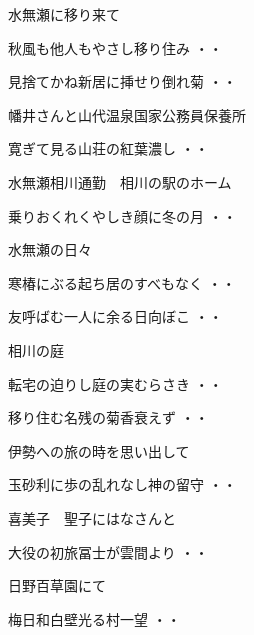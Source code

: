 水無瀬に移り来て
\begin{shiika}秋風も他人もやさし移り住み
\hfill{・・}\end{shiika}
\begin{shiika}見捨てかね新居に挿せり倒れ菊
\hfill{・・}\end{shiika}
\vspace{0.6cm}
幡井さんと山代温泉国家公務員保養所
\begin{shiika}寛ぎて見る山荘の紅葉濃し
\hfill{・・}\end{shiika}
\vspace{0.6cm}
水無瀬相川通勤　相川の駅のホーム
\begin{shiika}乗りおくれくやしき顔に冬の月
\hfill{・・}\end{shiika}
\vspace{0.6cm}
水無瀬の日々
\begin{shiika}寒椿にぶる起ち居のすべもなく
\hfill{・・}\end{shiika}
\vspace{0.6cm}
\begin{shiika}友呼ばむ一人に余る日向ぼこ
\hfill{・・}\end{shiika}
\vspace{0.6cm}
相川の庭
\begin{shiika}転宅の迫りし庭の実むらさき
\hfill{・・}\end{shiika}
\begin{shiika}移り住む名残の菊香衰えず
\hfill{・・}\end{shiika}
\vspace{0.6cm}
伊勢への旅の時を思い出して
\begin{shiika}玉砂利に歩の乱れなし神の留守
\hfill{・・}\end{shiika}
\vspace{0.6cm}
喜美子　聖子にはなさんと
\begin{shiika}大役の初旅冨士が雲間より
\hfill{・・}\end{shiika}
\vspace{0.6cm}
日野百草園にて
\begin{shiika}梅日和白壁光る村一望
\hfill{・・}\end{shiika}
